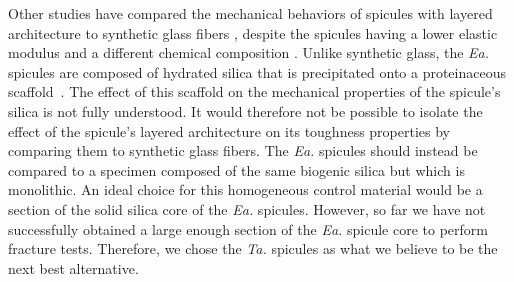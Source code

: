 \documentclass[12pt,onecolumn]{article}
\makeatletter
\newcommand{\TA}{\textit{Ta.\@}\xspace}
\newcommand{\EA}{\textit{Ea.\@}\xspace}
\makeatother
\begin{document}
Other studies have compared the mechanical behaviors of spicules with layered architecture to synthetic glass fibers \cite{johnson2010influence,levi1989remarkably,walter2007mechanisms,weaver2010unifying,mayer2005rigid}, despite the spicules having a lower elastic modulus and a different chemical composition \cite{arasuna2018structural, weaver2010unifying, woesz2006micromechanical}. Unlike synthetic glass, the \EA spicules are composed of hydrated silica that is precipitated onto a proteinaceous scaffold~\cite{ehrlich2010chitin}. The effect of this scaffold on the mechanical properties of the spicule's silica is not fully understood. It would therefore not be possible to isolate the effect of the spicule's layered architecture on its toughness properties by comparing them to synthetic glass fibers. The \EA spicules should instead be compared to a specimen composed of the same biogenic silica but which is monolithic. An ideal choice for this homogeneous control material would be a section of the solid silica core of the \EA spicules. However, so far we have not successfully obtained a large enough section of the \EA spicule core to perform fracture tests. Therefore, we chose the \TA spicules as what we believe to be the next best alternative.
%
\end{document}
